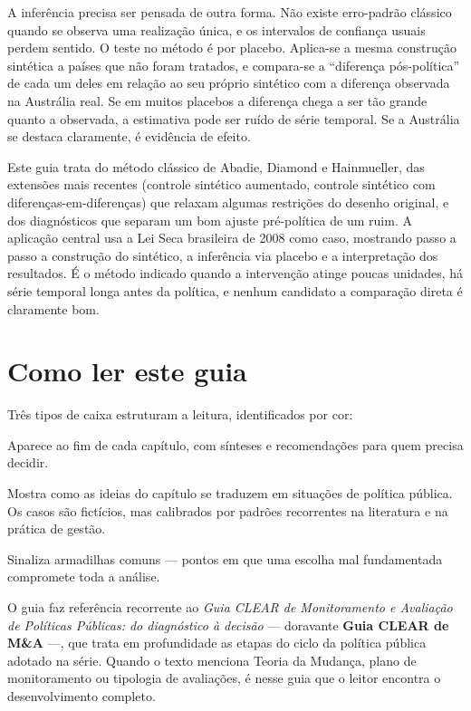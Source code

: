 \documentclass[12pt, a4paper, openany]{book}
\begin{document}
A inferência precisa ser pensada de outra forma. Não existe erro-padrão
clássico quando se observa uma realização única, e os intervalos de
confiança usuais perdem sentido. O teste no método é por placebo.
Aplica-se a mesma construção sintética a países que não foram tratados, e
compara-se a ``diferença pós-política'' de cada um deles em relação ao seu
próprio sintético com a diferença observada na Austrália real. Se em
muitos placebos a diferença chega a ser tão grande quanto a observada, a
estimativa pode ser ruído de série temporal. Se a Austrália se destaca
claramente, é evidência de efeito.

Este guia trata do método clássico de Abadie, Diamond e Hainmueller, das
extensões mais recentes (controle sintético aumentado, controle sintético
com diferenças-em-diferenças) que relaxam algumas restrições do desenho
original, e dos diagnósticos que separam um bom ajuste pré-política de um
ruim. A aplicação central usa a Lei Seca brasileira de 2008 como caso,
mostrando passo a passo a construção do sintético, a inferência via
placebo e a interpretação dos resultados. É o método indicado quando a
intervenção atinge poucas unidades, há série temporal longa antes da
política, e nenhum candidato a comparação direta é claramente bom.
\newpage

\thispagestyle{empty}
\section*{Como ler este guia}
Três tipos de caixa estruturam a leitura, identificados por cor:
\vspace{0.3cm}
\begin{notabox}
Aparece ao fim de cada capítulo, com sínteses e recomendações para quem
precisa decidir.
\end{notabox}
\begin{exemplobox}
Mostra como as ideias do capítulo se traduzem em situações de política
pública. Os casos são fictícios, mas calibrados por padrões recorrentes
na literatura e na prática de gestão.
\end{exemplobox}
\begin{atencaobox}
Sinaliza armadilhas comuns --- pontos em que uma escolha mal fundamentada
compromete toda a análise.
\end{atencaobox}
\vspace{0.5cm}
\noindent O guia faz referência recorrente ao \textit{Guia CLEAR de
Monitoramento e Avaliação de Políticas Públicas: do diagnóstico à decisão}
\citep{Lima2025} --- doravante \textbf{Guia CLEAR de M\&A} ---, que trata
em profundidade as etapas do ciclo da política pública adotado na série.
Quando o texto menciona Teoria da Mudança, plano de monitoramento ou
tipologia de avaliações, é nesse guia que o leitor encontra o
desenvolvimento completo.
\newpage
\end{document}

